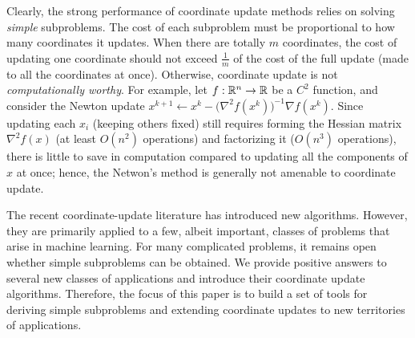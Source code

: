 
Clearly, the strong performance of coordinate
update methods relies on solving \emph{simple} subproblems. The cost of each subproblem must be proportional to how many coordinates it updates. %
When there are totally $m$ coordinates, the cost of updating one coordinate should not exceed $\frac{1}{m}$ of the cost of the full update (made to all the coordinates at once). Otherwise, coordinate update is not \emph{computationally worthy}. For example, let  $f:\mathbb{R}^n\to \mathbb{R}$ be  a $C^2$ function, and consider the Newton update  $x^{k+1} \gets x^k - \big(\nabla^2 f(x^k)\big)^{-1}\nabla f(x^k)$. Since updating each $x_i$ (keeping others  fixed) still requires forming the Hessian matrix $\nabla^2 f(x)$ (at least $O(n^2)$ operations) and factorizing it ($O(n^3)$ operations), there is little to save in computation compared to updating all the components of $x$ at once; hence, the Netwon's method is generally not amenable to coordinate update. 

The recent coordinate-update literature has introduced new algorithms. However, they are primarily applied to a few, albeit important, classes of problems  that arise in machine learning. For many complicated problems,  it remains open whether simple subproblems can be obtained. We provide positive answers to several new classes of applications and introduce their coordinate update algorithms. %
Therefore, the focus of this paper is to build a set of tools for deriving simple subproblems and extending  coordinate updates to new territories of applications.

